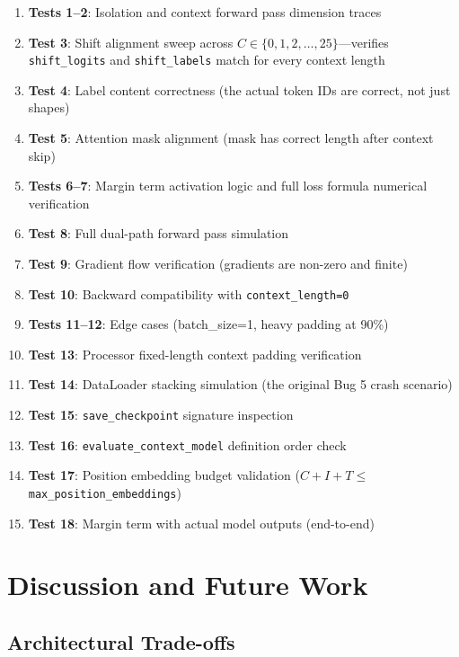 \documentclass[11pt, a4paper]{report}
\begin{document}
\begin{enumerate}[leftmargin=2em]
  \item \textbf{Tests 1--2}: Isolation and context forward pass dimension traces
  \item \textbf{Test 3}: Shift alignment sweep across $C \in \{0, 1, 2, \ldots, 25\}$---verifies \texttt{shift\_logits} and \texttt{shift\_labels} match for every context length
  \item \textbf{Test 4}: Label content correctness (the actual token IDs are correct, not just shapes)
  \item \textbf{Test 5}: Attention mask alignment (mask has correct length after context skip)
  \item \textbf{Tests 6--7}: Margin term activation logic and full loss formula numerical verification
  \item \textbf{Test 8}: Full dual-path forward pass simulation
  \item \textbf{Test 9}: Gradient flow verification (gradients are non-zero and finite)
  \item \textbf{Test 10}: Backward compatibility with \texttt{context\_length=0}
  \item \textbf{Tests 11--12}: Edge cases (batch\_size=1, heavy padding at 90\%)
  \item \textbf{Test 13}: Processor fixed-length context padding verification
  \item \textbf{Test 14}: DataLoader stacking simulation (the original Bug 5 crash scenario)
  \item \textbf{Test 15}: \texttt{save\_checkpoint} signature inspection
  \item \textbf{Test 16}: \texttt{evaluate\_context\_model} definition order check
  \item \textbf{Test 17}: Position embedding budget validation ($C + I + T \leq$ \texttt{max\_position\_embeddings})
  \item \textbf{Test 18}: Margin term with actual model outputs (end-to-end)
\end{enumerate}


\chapter{Discussion and Future Work}
\label{ch:discussion}

\section{Architectural Trade-offs}
\label{sec:tradeoffs}
\end{document}
